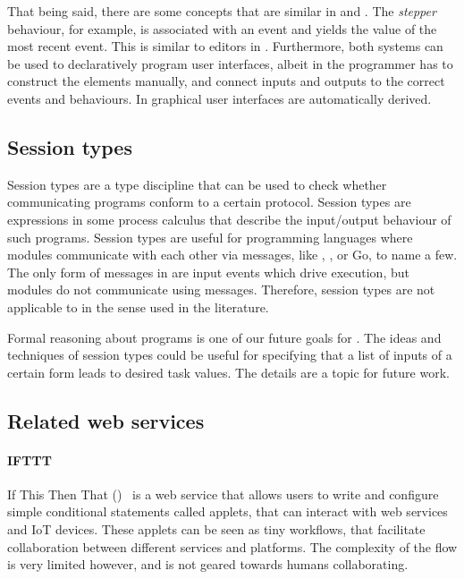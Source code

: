 That being said, there are some concepts that are similar in \TOP and \FRP.
The \emph{stepper} behaviour, for example, is associated with an event and yields the value of the most recent event.
This is similar to editors in \TOP.
Furthermore, both systems can be used to declaratively program user interfaces, albeit in \FRP the programmer has to construct the \GUI elements manually, and connect inputs and outputs to the correct events and behaviours.
In \TOP graphical user interfaces are automatically derived.


\subsection{Session types}

Session types are a type discipline that can be used to check whether communicating programs conform to a certain protocol.
Session types are expressions in some process calculus that describe the input/output behaviour of such programs.
Session types are useful for programming languages where modules communicate with each other via messages, like \CSP, \PICALC, or Go, to name a few.
The only form of messages in \TOP are input events which drive execution, but modules do not communicate using messages.
Therefore, session types are not applicable to \TOP in the sense used in the literature.

Formal reasoning about \TOP programs is one of our future goals for \TOPHAT.
The ideas and techniques of session types could be useful for specifying that a list of inputs of a certain form leads to desired task values.
The details are a topic for future work.


\subsection{Related web services}


\paragraph{IFTTT}

If This Then That (\IFTTT)~\cite{IFTTT} is a web service that allows users to write and
configure simple conditional statements called applets, that can interact with
web services and IoT devices. These applets can be seen as tiny workflows, that
facilitate collaboration between different services and platforms. The
complexity of the flow is very limited however, and is not geared towards humans
collaborating.


